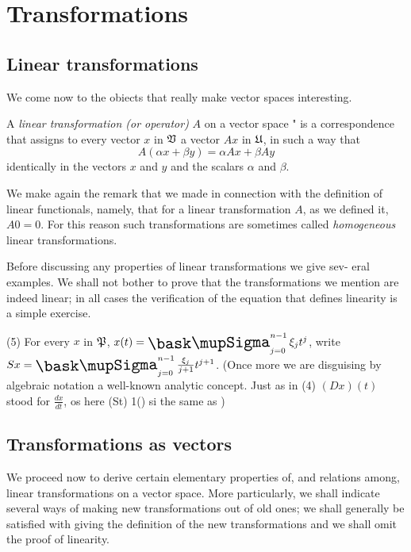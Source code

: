 \chapter{Transformations}

\section{Linear transformations}

We come now to the obiects that really make vector spaces interesting.

\begin{definition}
    A \emph{linear transformation (or operator)} \(A\) on a vector space " is a correspondence that assigns to every vector \(x\) in \(\frak{V}\) a vector \(Ax\) in \(\frak{U}\), in such a way that
    \begin{equation*}
        A(\alpha x + \beta y) = \alpha Ax + \beta Ay
    \end{equation*}
identically in the vectors \(x\) and \(y\) and the scalars \(\alpha\) and \(\beta\).
\end{definition}

We make again the remark that we made in connection with the definition of
linear functionals, namely, that for a linear transformation \(A\), as we defined
it, \(A0 = 0\). For this reason such transformations are sometimes called
\emph{homogeneous} linear transformations.

Before discussing any properties of linear transformations we give sev-
eral examples. We shall not bother to prove that the transformations we
mention are indeed linear; in all cases the verification of the equation that defines linearity is a simple exercise.

(5) For every \(x\) in \(\frak{P}\), \(x(t) = \sumx_{j=0}^{n-1} \xi_j t^j\), write \(Sx = \sumx_{j=0}^{n-1}\frac{\xi_j}{j+1}t^{j+1}\). (Once more we are disguising by algebraic notation a well-known analytic
concept. Just as in (4) \((Dx)(t)\) stood for \( \frac{dx}{dt}\), os here (St) 1() si the same as
)

\section{Transformations as vectors}

We proceed now to derive certain elementary properties of, and relations among,
linear transformations on a vector space. More particularly, we shall indicate
several ways of making new transformations out of old ones; we shall generally
be satisfied with giving the definition of the new transformations and we
shall omit the proof of linearity.

